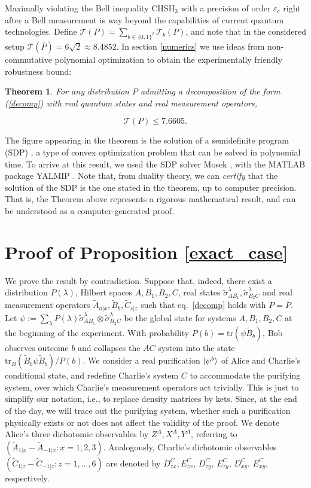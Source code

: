 \documentclass[onecolumn,prx,amsmath,amssymb]{revtex4-2}
\def\be{\begin{equation}}
\def\ee{\end{equation}}
\def\tr{\mbox{tr}}
\newtheorem{theo}{Theorem}
\begin{document}
\begin{appendix}
Maximally violating the Bell inequality $\text{CHSH}_3$ with a precision of order $\varepsilon_c$ right after a Bell measurement is way beyond the capabilities of current quantum technologies. Define $\mathscr{T}(P)=\sum_{b\in\{0,1\}^2}\mathscr{T}_b(P)$, and note that in the considered setup $\mathscr{T}(\bar{P})=6\sqrt{2}\approx 8.4852$. 
In section \ref{numerics} we use ideas from non-commutative polynomial optimization \cite{NOP} to obtain the experimentally friendly robustness bound:


\begin{theo}
\label{main_theo}
For any distribution $P$ admitting a decomposition of the form (\ref{decomp}) with real quantum states and real measurement operators, 

\be
\mathscr{T}(P)\leq 7.6605.
\label{violation}
\ee
\end{theo}

\noindent The figure appearing in the theorem is the solution of a semidefinite program (SDP) \cite{sdp}, a type of convex optimization problem that can be solved in polynomial time. To arrive at this result, we used the SDP solver Mosek \cite{mosek}, with the MATLAB package YALMIP \cite{yalmip}. Note that, from duality theory, we can \emph{certify} that the solution of the SDP is the one stated in the theorem, up to computer precision. That is, the Theorem above represents a rigorous mathematical result, and can be understood as a computer-generated proof.


\section{Proof of Proposition \ref{exact_case}} \label{sec:pbar}
We prove the result by contradiction. Suppose that, indeed, there exist a distribution $P(\lambda)$, Hilbert spaces $A,B_1,B_2,C$, real states $\tilde{\sigma}_{AB_1}^\lambda,\tilde{\sigma}_{B_2C}^\lambda$ and real measurement operators $\tilde{A}_{a|x}, \tilde{B}_{b}, \tilde{C}_{c|z}$ such that eq.~\eqref{decomp} holds with $P=\bar{P}$. Let $\psi:=\sum_\lambda P(\lambda)\tilde{\sigma}^{\lambda}_{AB_1}\otimes\tilde{\sigma}^{\lambda}_{B_2C}$ be the global state for systems $A, B_1, B_2, C$ at the beginning of the experiment. With probability $P(b)=\tr(\psi \tilde{B}_b)$, Bob observes outcome $b$ and collapses the $AC$ system into the state $\tr_{B}(\tilde{B}_b \psi \tilde{B}_b)/P(b)$. We consider a real purification $|\psi^b\rangle$ of Alice and Charlie's conditional state, and redefine Charlie's system $C$ to accommodate the purifying system, over which Charlie's measurement operators act trivially. This is just to simplify our notation, i.e., to replace density matrices by kets. Since, at the end of the day, we will trace out the purifying system, whether such a purification physically exists or not does not affect the validity of the proof. We denote Alice's three dichotomic observables by $Z^A, X^A, Y^A$, referring to $(\tilde{A}_{1|x}-\tilde{A}_{-1|x}:x=1,2,3)$. Analogously, Charlie's dichotomic observables $(\tilde{C}_{1|z}-\tilde{C}_{-1|z}:z=1,...,6)$ are denoted by $D^C_{zx}, E^C_{zx}$, $D^C_{zy}$, $E^C_{zy}$, $D^C_{xy}$, $E^C_{xy}$, respectively.


\end{appendix}
\end{document}
